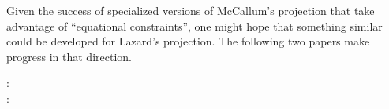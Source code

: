 \documentclass{article}
\begin{document}
Given the success of specialized versions of McCallum's projection
that take advantage of ``equational constraints'', one might hope that
something similar could be developed for Lazard's projection. The
following two papers make progress in that direction.
%
\begin{description}
\item[\autocite{NairDavenportSankaran:2020} :]  
\item[\autocite{DavenportEtAl:2023} :]  
\end{description}
%


\printbibliography
\end{document}
